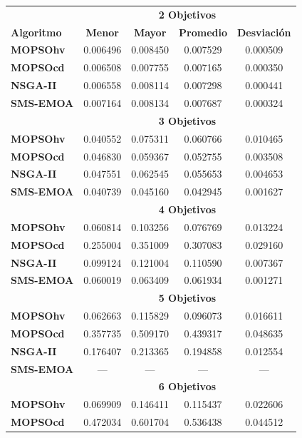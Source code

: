 \begin{longtable}{|l|cc|cc|} 
\hline
    & \multicolumn{4}{|c|}{\textbf{2 Objetivos}} \\ 
	\textbf{Algoritmo} & \textbf{Menor} & \textbf{Mayor} & \textbf{Promedio} & \textbf{Desviaci\'on} \\  \hline \hline
	\textbf{MOPSOhv} & 0.006496 & 0.008450 & 0.007529 & 0.000509 \\ 
	\textbf{MOPSOcd} & 0.006508 & 0.007755 & 0.007165 & 0.000350 \\ 
	\textbf{NSGA-II} & 0.006558 & 0.008114 & 0.007298 & 0.000441 \\  
	\textbf{SMS-EMOA}& 0.007164 & 0.008134 & 0.007687 & 0.000324  \\  
	\hline\hline
    & \multicolumn{4}{|c|}{\textbf{3  Objetivos}} \\ 
	\hline\hline
	\textbf{MOPSOhv} & 0.040552 & 0.075311 & 0.060766 & 0.010465 \\ 
	\textbf{MOPSOcd} & 0.046830 & 0.059367 & 0.052755 & 0.003508 \\ 
	\textbf{NSGA-II} & 0.047551 & 0.062545 & 0.055653 & 0.004653 \\  
	\textbf{SMS-EMOA}& 0.040739 & 0.045160 & 0.042945 & 0.001627 \\
	\hline\hline
    & \multicolumn{4}{|c|}{\textbf{4 Objetivos}} \\ 
	\hline\hline
	\textbf{MOPSOhv} & 0.060814 & 0.103256 & 0.076769 & 0.013224 \\ 
	\textbf{MOPSOcd} & 0.255004 & 0.351009 & 0.307083 & 0.029160 \\ 
	\textbf{NSGA-II} & 0.099124 & 0.121004 & 0.110590 & 0.007367 \\  
	\textbf{SMS-EMOA}& 0.060019 & 0.063409 & 0.061934 & 0.001271 \\ 
	\hline\hline
 & \multicolumn{4}{|c|}{\textbf{5 Objetivos}} \\ 
	\hline\hline
	\textbf{MOPSOhv} & 0.062663 & 0.115829 & 0.096073 & 0.016611    \\ 
	\textbf{MOPSOcd} & 0.357735 & 0.509170 & 0.439317 & 0.048635 \\ 
	\textbf{NSGA-II} & 0.176407 & 0.213365 & 0.194858 & 0.012554  \\  
	\textbf{SMS-EMOA} & --- & --- & --- & --- \\
	\hline\hline
& \multicolumn{4}{|c|}{\textbf{6 Objetivos}} \\ 
	\hline\hline
	\textbf{MOPSOhv} & 0.069909 & 0.146411 & 0.115437 & 0.022606    \\ 
	\textbf{MOPSOcd} & 0.472034 & 0.601704 & 0.536438 & 0.044512 \\ 

\end{longtable}
